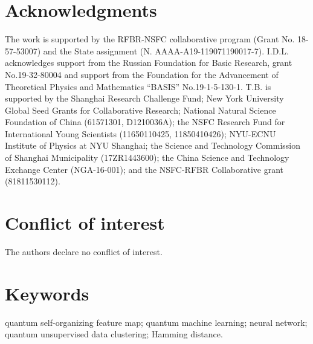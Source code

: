 \documentclass[pra,showkeys,twocolumn,showpacs]{revtex4-1}
\begin{document}
\section*{Acknowledgments}
The work is supported by the RFBR-NSFC collaborative program (Grant No. 18-57-53007) and the State assignment (N. AAAA-A19-119071190017-7). I.D.L. acknowledges support from the Russian Foundation for Basic Research, grant No.19-32-80004 and support from the Foundation for the Advancement of Theoretical Physics and Mathematics “BASIS” No.19-1-5-130-1. T.B. is supported by the Shanghai Research Challenge Fund; New York University Global Seed Grants for Collaborative Research; National Natural Science Foundation of China (61571301, D1210036A); the NSFC Research Fund for International Young Scientists (11650110425, 11850410426); NYU-ECNU Institute of Physics at NYU Shanghai; the Science and Technology Commission of Shanghai Municipality (17ZR1443600); the China Science and Technology Exchange Center (NGA-16-001); and the NSFC-RFBR Collaborative grant (81811530112).











\section*{Conflict of interest}

The authors declare no conflict of interest.


\section*{Keywords}
quantum self-organizing feature map; quantum machine learning; neural network; quantum unsupervised data clustering; Hamming distance.



\end{document}
